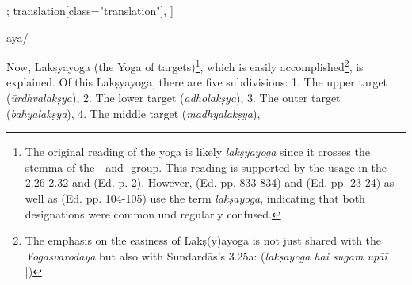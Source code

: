 \begin{alignment}[
  texts=edition[class="edition"];
  translation[class="translation"],
  ]
\begin{edition}
\begin{prose}[p14_01]
aya/
    \end{prose}
  \end{edition}
  \begin{translation}
    \label{laksyayogatrans}
    \begin{tlate}[p13_01]
      \noindent
   Now, Lakṣyayoga (the Yoga of targets)\footnote{The original reading of the yoga is likely \textit{lakṣyayoga} since it crosses the stemma of the \alpha- and \beta-group. This reading is supported by the usage in the  2.26-2.32 and  (Ed. p. 2). However,  (Ed. pp. 833-834)  and  (Ed. pp. 23-24)  as well as  (Ed. pp. 104-105) use the term \textit{lakṣayoga}, indicating that both designations were common und regularly confused.}, which is easily accomplished\footnote{The emphasis on the easiness of Lakṣ(y)ayoga is not just shared with the \textit{Yogasvarodaya} but also with Sundardās's  3.25a: (\textit{lakṣayoga hai sugam upāī} |)}, is explained. Of this Lakṣyayoga, there are five subdivisions:
   1. The upper target (\textit{ūrdhvalakṣya}),
   2. The lower target (\textit{adholakṣya}),
   3. The outer target (\textit{bahyalakṣya}),
   4. The middle target (\textit{madhyalakṣya}),

\end{tlate}
\end{translation}
\end{alignment}
